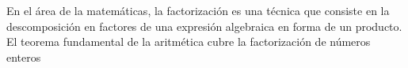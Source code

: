 En el área de la matemáticas, la factorización es una técnica que consiste en la descomposición en factores de una expresión algebraica
en forma de un producto. El teorema fundamental de la aritmética cubre la factorización de números enteros